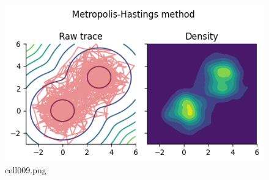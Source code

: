 \begin{figure}[ht]
	\centering
	\includegraphics[scale=0.8, max width=\linewidth]{./fig/bayesian-brain/mcmc/cell009.png}
	\caption{cell009.png}
	\label{cell009.png}
\end{figure}